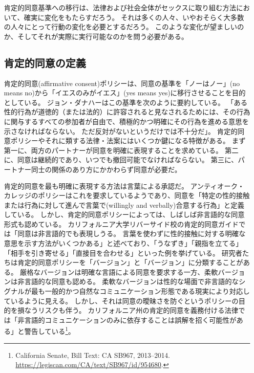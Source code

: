\documentclass[paper=a4,book,openany]{jlreq}
\newcommand{\ig}[1]{}           %
\begin{document}
肯定的同意基準への移行は、法律および社会全体がセックスに取り組む方法において、確実に変化をもたらすだろう。
それは多くの人々、いやおそらく大多数の人々にとって行動の変化を必要とするだろう。
このような変化が望ましいのか、そしてそれが実際に実行可能なのかを問う必要がある。

\subsection{肯定的同意の定義}

肯定的同意(affirmative consent)ポリシーは、同意の基準を「ノーはノー」(no means no)から「イエスのみがイエス」(yes means yes)に移行させることを目的としている。
ジョン・ダナハー\ig{John Danaher}はこの基準を次のように要約している。
「ある性的行為が道徳的（または法的）に許容されると見なされるためには、その行為に関与するすべての参加者が自由で、積極的かつ明確にその行為を進める意思を示さなければならない。
ただ反対がないというだけでは不十分だ」\citep{danaher14:_yes_means_yes}。
肯定的同意ポリシーやそれに類する法律・法案にはいくつか鍵になる特徴がある。
まず第一に、両方のパートナーが同意を明確に表現することを求めている。
第二に、同意は継続的であり、いつでも撤回可能でなければならない。
第三に、パートナー同士の関係のあり方にかかわらず同意が必要だ。

肯定的同意を最も明確に表現する方法は言葉による承認だ。
アンティオーク・カレッジのポリシーはこれを要求しているようであり、同意を「特定の性的接触または行為に対して進んで言葉で(willingly and verbally)合意する行為」と定義している\citep{college25:_sexual_offen_preven_polic}。
しかし、肯定的同意ポリシーによっては、しばしば非言語的な同意形式も認めている。
カリフォルニア大学リバーサイド校の肯定的同意ガイドでは「同意は非言語的でも表現しうる。
言葉を使わずに性的接触に対する明確な意思を示す方法がいくつかある」と述べており、「うなずき」「親指を立てる」「相手を引き寄せる」「直接目を合わせる」といった例を挙げている\citep{university25:_what_is_consen}。
研究者たちは肯定的同意ポリシーを「バージョン」と「バージョン」に分類することがある。
厳格なバージョンは明確な言語による同意を要求する一方、柔軟バージョンは非言語的な同意も認める。
柔軟なバージョンは性的な場面で非言語的なシグナルが最も一般的かつ自然なコミュニケーション形態である現実により対応しているように見える。
しかし、それは同意の曖昧さを防ぐというポリシーの目的を損なうリスクも伴う。
カリフォルニア州の肯定的同意を義務付ける法律では「非言語的コミュニケーションのみに依存することは誤解を招く可能性がある」と警告している\footnote{California Senate, Bill Text: CA SB967, 2013--2014. \url{https://legiscan.com/CA/text/SB967/id/954680}.}。
\end{document}
